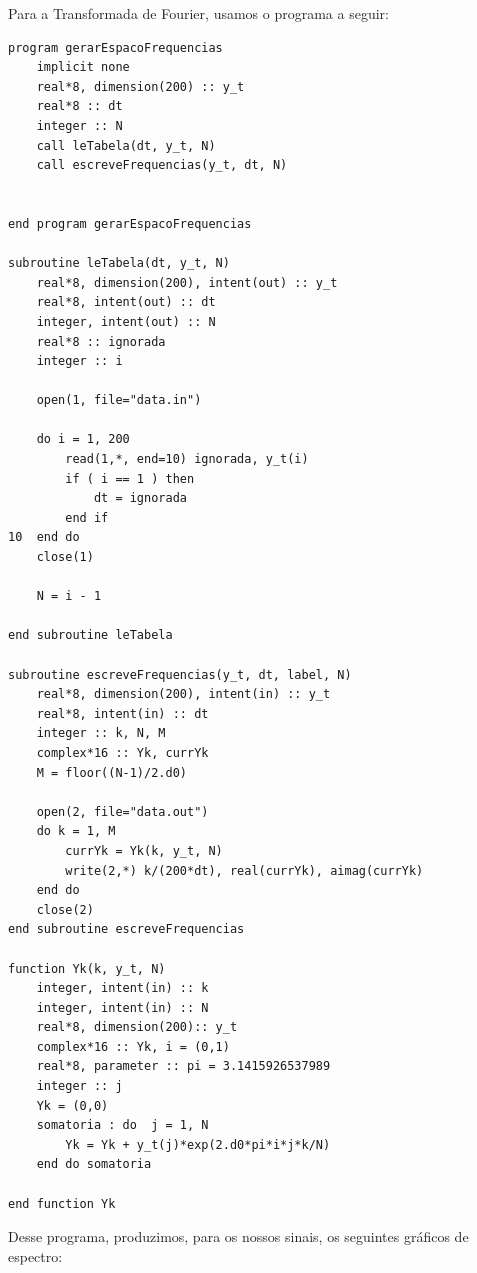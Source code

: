 \documentclass[11pt]{article}
\begin{document}
Para a Transformada de Fourier, usamos o programa a seguir:
\begin{verbatim}
program gerarEspacoFrequencias
    implicit none
    real*8, dimension(200) :: y_t
    real*8 :: dt
    integer :: N
    call leTabela(dt, y_t, N)
    call escreveFrequencias(y_t, dt, N)


end program gerarEspacoFrequencias

subroutine leTabela(dt, y_t, N)
    real*8, dimension(200), intent(out) :: y_t
    real*8, intent(out) :: dt
    integer, intent(out) :: N
    real*8 :: ignorada
    integer :: i

    open(1, file="data.in")

    do i = 1, 200
        read(1,*, end=10) ignorada, y_t(i)
        if ( i == 1 ) then
            dt = ignorada
        end if
10  end do
    close(1)

    N = i - 1

end subroutine leTabela

subroutine escreveFrequencias(y_t, dt, label, N)
    real*8, dimension(200), intent(in) :: y_t
    real*8, intent(in) :: dt
    integer :: k, N, M
    complex*16 :: Yk, currYk
    M = floor((N-1)/2.d0)

    open(2, file="data.out")
    do k = 1, M
        currYk = Yk(k, y_t, N)
        write(2,*) k/(200*dt), real(currYk), aimag(currYk)
    end do
    close(2)
end subroutine escreveFrequencias

function Yk(k, y_t, N)
    integer, intent(in) :: k
    integer, intent(in) :: N
    real*8, dimension(200):: y_t
    complex*16 :: Yk, i = (0,1)
    real*8, parameter :: pi = 3.1415926537989
    integer :: j
    Yk = (0,0)
    somatoria : do  j = 1, N
        Yk = Yk + y_t(j)*exp(2.d0*pi*i*j*k/N)
    end do somatoria

end function Yk
\end{verbatim}

Desse programa, produzimos, para os nossos sinais, os seguintes gráficos de espectro:
\end{document}

